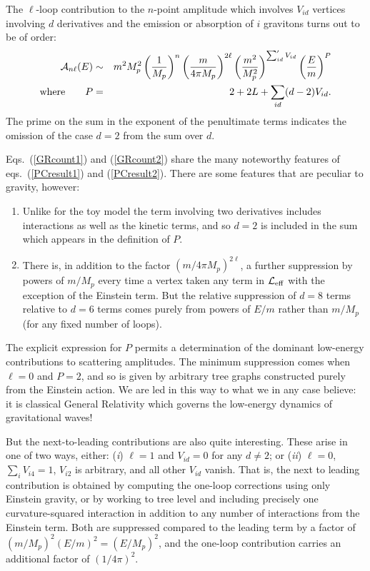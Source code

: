 \documentclass[12pt]{article}
\def\pref#1{(\ref{#1})}
\begin{document}
The $\ell$-loop contribution to the $n$-point amplitude which
involves $V_{id}$ vertices involving $d$ derivatives and
the emission or absorption of $i$ gravitons turns
out to be of order:
%
\begin{eqnarray}
\label{GRcount1}
{\cal A}_{n\ell}(E) &\sim& m^2 M_p^2 \left( {1 \over M_p}
\right)^n \left( {m \over 4 \pi M_p} \right)^{2 \ell} 
\left( {m^2 \over M_p^2} \right)^{\sum_{id}' V_{id}}
\left( {E \over m} \right)^P \nonumber\\
\hbox{where} \qquad P &=& 2 + 2L + \sum_{id}
(d-2) V_{id}.
\label{GRcount2}
\end{eqnarray}
%
The prime on the sum in the exponent of the penultimate
terms indicates the omission of the case $d=2$ from 
the sum over $d$. 

Eqs.~\pref{GRcount1} and \pref{GRcount2} share
the many noteworthy features of eqs.~\pref{PCresult1}
and \pref{PCresult2}. There are some features that are
peculiar to gravity, however:

\begin{enumerate}
\item
Unlike for the toy model the term involving
two derivatives includes interactions as well as the kinetic
terms, and so $d=2$ is included in the sum which appears
in the definition of $P$. 
%
\item
There is, in addition to the factor $(m/4 \pi M_p)^{2\ell}$,
a further suppression by powers of $m/M_p$ every time
a vertex taken any term in ${\cal L}_{\rm eff}$ with
the exception of the Einstein term. But the relative
suppression of $d = 8$ terms relative to $d=6$ terms
comes purely from powers of $E/m$ rather than
$m/M_p$ (for any fixed number of loops). 
%
\end{enumerate}

The explicit expression for $P$ permits a determination
of the dominant low-energy contributions to scattering
amplitudes. The minimum suppression comes when
$\ell = 0$ and $P = 2$, and so is given by arbitrary
tree graphs constructed purely from the Einstein action.
We are led in this way to what we in any case believe:
it is classical General Relativity which governs the 
low-energy dynamics of gravitational waves!

But the next-to-leading contributions are also quite
interesting. These arise in one of two ways, either:
({\it i}) $\ell = 1$ and $V_{id} = 0$ for any $d\ne 2$;
or ({\it ii}) $\ell = 0$, $\sum_i V_{i4} = 1$, 
$V_{i2}$ is arbitrary, and all other $V_{id}$ vanish.
That is, the next to leading contribution is obtained by
computing the one-loop corrections using only Einstein
gravity, or by working to tree level and including precisely
one curvature-squared interaction in addition to any
number of interactions from the Einstein term. Both
are suppressed compared to the leading term by a factor
of $(m/M_p)^2(E/m)^2 = (E/M_p)^2$, and the one-loop
contribution carries an additional factor of $(1/4\pi)^2$. 
\end{document}
